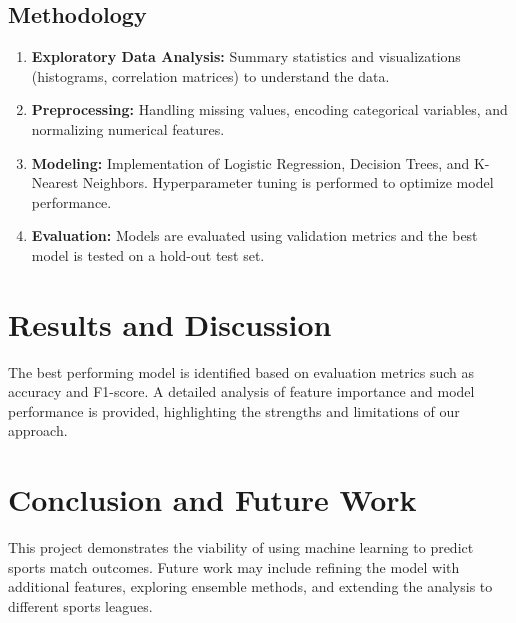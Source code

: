 \documentclass[a4paper,12pt]{article}
\begin{document}
\subsection{Methodology}
\begin{enumerate}
    \item \textbf{Exploratory Data Analysis:} Summary statistics and visualizations (histograms, correlation matrices) to understand the data.
    \item \textbf{Preprocessing:} Handling missing values, encoding categorical variables, and normalizing numerical features.
    \item \textbf{Modeling:} Implementation of Logistic Regression, Decision Trees, and K-Nearest Neighbors. Hyperparameter tuning is performed to optimize model performance.
    \item \textbf{Evaluation:} Models are evaluated using validation metrics and the best model is tested on a hold-out test set.
\end{enumerate}

\section{Results and Discussion}
The best performing model is identified based on evaluation metrics such as accuracy and F1-score. A detailed analysis of feature importance and model performance is provided, highlighting the strengths and limitations of our approach.

\section{Conclusion and Future Work}
This project demonstrates the viability of using machine learning to predict sports match outcomes. Future work may include refining the model with additional features, exploring ensemble methods, and extending the analysis to different sports leagues.



\end{document}

